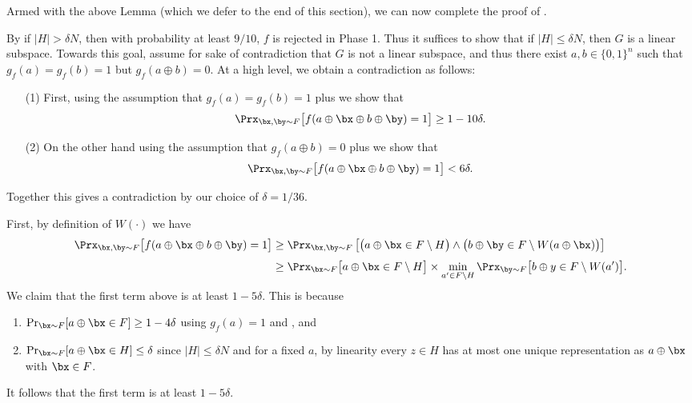 \documentclass[11pt]{article}
\theoremstyle{definition}
\begin{document}
Armed with the above Lemma (which we defer to the end of this section), we can now complete the proof of  .

\begin{proofof}{}
By  if $|H| >\delta N$, then with probability at least $9/10$, $f$ is rejected in Phase 1. 
Thus it suffices to show that if $|H| \leq \delta N$, then $G$ is a linear subspace.
Towards this goal, assume for sake of contradiction that $G$ is not a linear subspace, and thus there exist $a,b \in \{0,1\}^n$ such that $g_f(a)=g_f(b)=1$ but $g_f(a \oplus b)=0$.
At a high level, we obtain a contradiction as follows: 
\begin{itemize}
    \item [(1)] First, using the assumption that $g_f(a)=g_f(b)=1$ plus   we show that
$$\Prx_{\bx,\by \sim F}\big[f(a \oplus \bx \oplus b \oplus \by)=1\big] \geq 1-10\delta.$$
\item[(2)] On the other hand using the assumption that $g_f(a \oplus b)=0$ plus  we show that
$$\Prx_{\bx,\by \sim F}\big[f(a \oplus \bx \oplus b \oplus \by)=1\big] < 6 \delta.$$
\end{itemize}
Together this gives a contradiction by our choice of $\delta=1/36$.

\medskip

First, by definition of $W(\cdot)$ we have
\begin{align*}
    \Prx_{\bx,\by \sim F}\big[f(a \oplus \bx \oplus b \oplus \by)=1\big]   &\geq \Prx_{\bx,\by \sim F}\left[\big( a \oplus \bx \in F \setminus H\big) \land \big(b \oplus \by \in F \setminus W(a \oplus \bx)\big)\right] \\[0.8ex]
    & \geq \Prx_{\bx \sim F}\big[ a \oplus \bx \in F \setminus H\big] \times \min_{a' \in F \setminus H} \Prx_{\by \sim F}\big[ b \oplus y \in F  \setminus W(a')\big].
\end{align*}
We claim that the first term above is at least $1-5 \delta$.
This is because 
\begin{flushleft}\begin{enumerate}
\item $\Pr_{\bx \sim F}[a \oplus \bx \in F] \geq 1-4\delta$ using $g_f(a)=1$ and , and 
\item $\Pr_{\bx \sim F}[a \oplus \bx \in H] \leq \delta$ since $|H|\le \delta N$ and for a fixed $a$, by linearity every $z \in H$ has {at most one} unique representation as $a \oplus \bx$ with $\bx\in F$. \end{enumerate}\end{flushleft}
It follows that the first term is at least $1-5\delta$.



\end{proofof}
\end{document}
